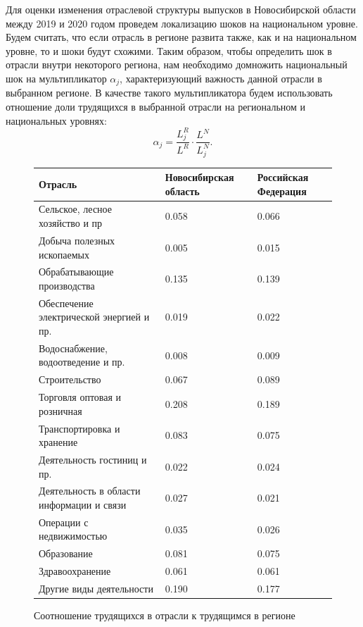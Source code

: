 \documentclass[12pt, a4paper]{article}
\begin{document}
Для оценки изменения отраслевой структуры выпусков в Новосибирской области между 2019 и 2020 годом проведем локализацию шоков на национальном уровне. Будем считать, что если отрасль в регионе развита также, как и на национальном уровне, то и шоки будут схожими. Таким образом, чтобы определить шок в отрасли внутри некоторого региона, нам необходимо домножить национальный шок на мультипликатор $\alpha_j$, характеризующий важность данной отрасли в выбранном регионе. В качестве такого мультипликатора будем использовать отношение доли трудящихся в выбранной отрасли на региональном и национальных уровнях:
$$
\alpha_j = \dfrac{L_j^R}{L^R} \cdot \dfrac{L^N}{L_j^N}.
$$
\begin{figure}
\begin{center}
\begin{tabular}{|l|l|l|}
\hline
Отрасль & Новосибирская область & Российская Федерация\\
\hline
 Сельское, лесное хозяйство и пр &  0.058 & 0.066\\
 Добыча полезных ископаемых & 0.005  &  0.015\\
 Обрабатывающие производства & 0.135 &  0.139\\
 Обеспечение электрической энергией и пр. &  0.019 & 0.022\\
 Водоснабжение, водоотведение и пр. & 0.008  & 0.009\\
 Строительство &  0.067  & 0.089\\
 Торговля оптовая и розничная &  0.208 & 0.189\\
Транспортировка и хранение & 0.083 &  0.075\\
 Деятельность гостиниц и пр. & 0.022 & 0.024\\
 Деятельность в области информации и связи & 0.027 & 0.021\\
 Операции с недвижимостью &  0.035 & 0.026\\
 Образование & 0.081 &0.075 \\
 Здравоохранение & 0.061 &  0.061\\
 Другие виды деятельности & 0.190 &0.177\\
\hline
\end{tabular}
\label{t_lab_vvp}
\caption{Соотношение трудящихся в отрасли к трудящимся в регионе}
\end{center}
\end{figure}
\end{document}
